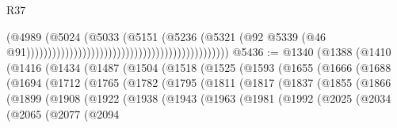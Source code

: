 \begin{lexlean}{R37}
\begin{coremodule}
                                                                                  (@4989
                                                                                    (@5024
                                                                                      (@5033
                                                                                        (@5151
                                                                                          (@5236
                                                                                            (@5321
                                                                                              (@92
                                                                                                @5339
                                                                                                (@46
                                                                                                  @91)))))))))))))))))))))))))))))))))))))))))))))))
@5436 := @1340
    (@1388
      (@1410
        (@1416
          (@1434
            (@1487
              (@1504
                (@1518
                  (@1525
                    (@1593
                      (@1655
                        (@1666
                          (@1688
                            (@1694
                              (@1712
                                (@1765
                                  (@1782
                                    (@1795
                                      (@1811
                                        (@1817
                                          (@1837
                                            (@1855
                                              (@1866
                                                (@1899
                                                  (@1908
                                                    (@1922
                                                      (@1938
                                                        (@1943
                                                          (@1963
                                                            (@1981
                                                              (@1992
                                                                (@2025
                                                                  (@2034
                                                                    (@2065
                                                                      (@2077
                                                                        (@2094

\end{coremodule}
\end{lexlean}
